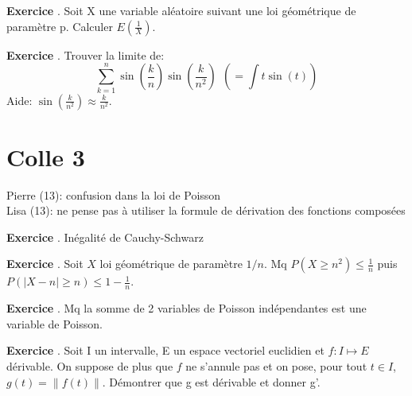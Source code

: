 \documentclass[10pt,a4paper]{article}
\newcounter{question}
\newcounter{exo}
\newenvironment{exo}{\vspace{0.5cm}\setcounter{question}{0}\addtocounter{exo}{1} \noindent \textbf{Exercice \theexo}. \normalsize }{\par}
\begin{document}

	\begin{exo}
		Soit X une variable aléatoire suivant une loi géométrique de paramètre p. Calculer $E(\frac{1}{X})$.
	\end{exo}
	
	\begin{exo}
		Trouver la limite de:
		$$\sum_{k=1}^{n} \sin(\frac{k}{n}) \sin(\frac{k}{n^2}) ~~(= \int t \sin(t))$$
		Aide: $\sin(\frac{k}{n^2}) \approx \frac{k}{n^2}$.
	\end{exo}

	\section*{Colle 3}
	\setcounter{exo}{0}
	Pierre (13): confusion dans la loi de Poisson\\
	Lisa (13): ne pense pas à utiliser la formule de dérivation des fonctions composées\\

	\begin{exo}
		Inégalité de Cauchy-Schwarz
	\end{exo}

	\begin{exo}
		Soit $X$ loi géométrique de paramètre $1/n$. Mq $P(X \geq n^2) \leq \frac{1}{n}$ puis $P(\vert X - n \vert \geq n) \leq 1 - \frac{1}{n}$.
	\end{exo}

	\begin{exo}
		Mq la somme de 2 variables de Poisson indépendantes est une variable de Poisson.
	\end{exo}

	\begin{exo}
	Soit I un intervalle, E un espace vectoriel euclidien et $f:I \longmapsto E$ dérivable. On suppose de plus que $f$ ne s'annule pas et on pose, pour tout $t\in I$, $g(t)= \parallel f(t) \parallel$. Démontrer que g est dérivable et donner g'.
	\end{exo}

%	
\end{document}
